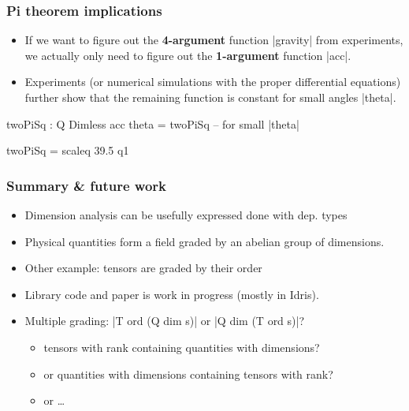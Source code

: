 \documentclass[aspectratio=169]{beamer}
\begin{document}
\begin{frame}
\frametitle{Pi theorem implications}
\begin{itemize}
\item If we want to figure out the \textbf{4-argument} function
  |gravity| from experiments, we actually only need to figure out the
  \textbf{1-argument} function |acc|.
\item Experiments (or numerical simulations with the proper
  differential equations) further show that the remaining function is
  constant for small angles |theta|.
\end{itemize}

\begin{code}
  twoPiSq : Q Dimless
  acc theta = twoPiSq        -- for small |theta|

  twoPiSq = scaleq 39.5 q1
\end{code}

\end{frame}
\begin{frame}
\frametitle{Summary \& future work}
\begin{itemize}
\item Dimension analysis can be usefully expressed done with dep. types
\item Physical quantities form a field graded by an abelian group of
  dimensions.
\item Other example: tensors are graded by their order
\item Library code and paper is work in progress (mostly in Idris).
\item Multiple grading: |T ord (Q dim s)| or |Q dim (T ord s)|?
  \begin{itemize}
  \item tensors with rank containing quantities with dimensions?
  \item or quantities with dimensions containing tensors with rank?
  \item or \ldots{}
  \end{itemize}
\end{itemize}
\end{frame}
\end{document}
